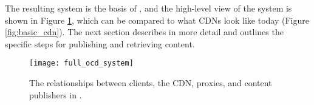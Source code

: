 The resulting system is the basis of \system{}, and the high-level view of the system is shown in Figure \ref{fig:ocd_overview}, 
which can be compared to what CDNs look like today (Figure \ref{fig:basic_cdn}).  The next section describes \system{} in more 
detail and outlines the specific steps for publishing and retrieving content.

\begin{figure}[t]
\centering
\texttt{[image: full\_ocd\_system]}
\caption{The relationships between clients, the CDN, proxies, and content publishers in 
\system{}.}
\label{fig:ocd_overview}
\end{figure}
